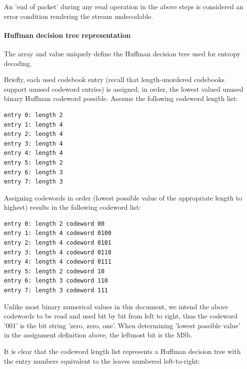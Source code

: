 An 'end of packet' during any read operation in the above steps is
considered an error condition rendering the stream undecodable.

\paragraph{Huffman decision tree representation}

The  array and
 value uniquely define the Huffman decision
tree used for entropy decoding.

Briefly, each used codebook entry (recall that length-unordered
codebooks support unused codeword entries) is assigned, in order, the
lowest valued unused binary Huffman codeword possible.  Assume the
following codeword length list:

\begin{Verbatim}[commandchars=\\\{\}]
entry 0: length 2
entry 1: length 4
entry 2: length 4
entry 3: length 4
entry 4: length 4
entry 5: length 2
entry 6: length 3
entry 7: length 3
\end{Verbatim}

Assigning codewords in order (lowest possible value of the appropriate
length to highest) results in the following codeword list:

\begin{Verbatim}[commandchars=\\\{\}]
entry 0: length 2 codeword 00
entry 1: length 4 codeword 0100
entry 2: length 4 codeword 0101
entry 3: length 4 codeword 0110
entry 4: length 4 codeword 0111
entry 5: length 2 codeword 10
entry 6: length 3 codeword 110
entry 7: length 3 codeword 111
\end{Verbatim}


\begin{note}
Unlike most binary numerical values in this document, we
intend the above codewords to be read and used bit by bit from left to
right, thus the codeword '001' is the bit string 'zero, zero, one'.
When determining 'lowest possible value' in the assignment definition
above, the leftmost bit is the MSb.
\end{note}

It is clear that the codeword length list represents a Huffman
decision tree with the entry numbers equivalent to the leaves numbered
left-to-right:

